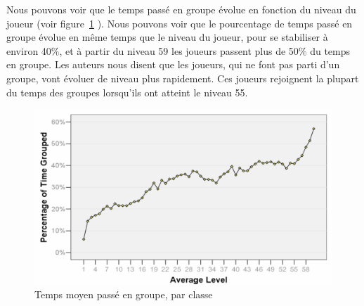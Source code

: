 \documentclass[11pt,a4paper]{article}
\begin{document}
\par Nous pouvons voir que le temps passé en groupe évolue en fonction du niveau du joueur (voir figure~\ref{timespentgroup} ). Nous pouvons voir que le pourcentage de temps passé en groupe évolue en même temps que le niveau du joueur, pour se stabiliser à environ 40\%, et à partir du niveau 59 les joueurs passent plus de 50\% du temps en groupe. Les auteurs nous disent que les joueurs, qui ne font pas parti d'un groupe, vont évoluer de niveau plus rapidement. Ces joueurs rejoignent la plupart du temps des groupes lorsqu'ils ont atteint le niveau 55. 
	\begin{figure}[!h]
        \centering
        \includegraphics[scale=0.95]{./images/timespentgroup.png}
        \caption{Temps moyen passé en groupe, par classe}
        \label{timespentgroup}
        \end{figure}
\end{document}

